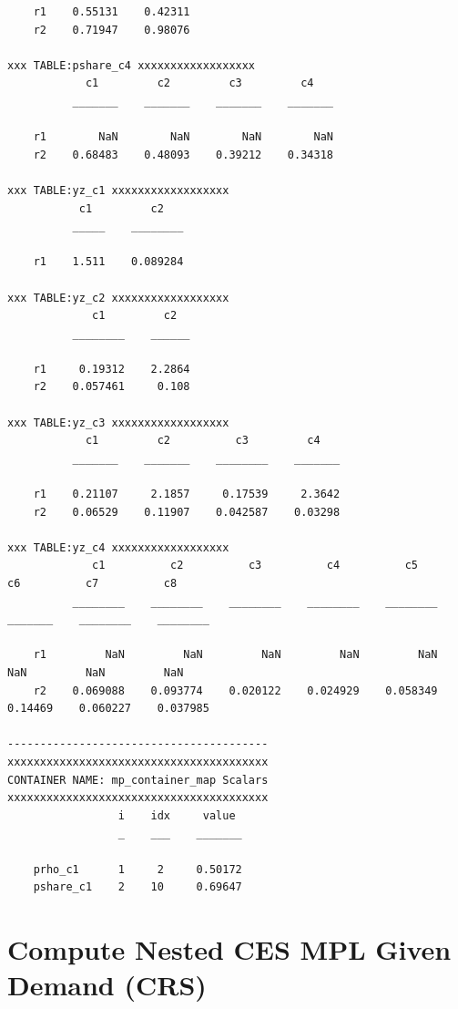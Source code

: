 \documentclass[
]{book}
\begin{document}
\begin{verbatim}
    r1    0.55131    0.42311
    r2    0.71947    0.98076

xxx TABLE:pshare_c4 xxxxxxxxxxxxxxxxxx
            c1         c2         c3         c4   
          _______    _______    _______    _______

    r1        NaN        NaN        NaN        NaN
    r2    0.68483    0.48093    0.39212    0.34318

xxx TABLE:yz_c1 xxxxxxxxxxxxxxxxxx
           c1         c2   
          _____    ________

    r1    1.511    0.089284

xxx TABLE:yz_c2 xxxxxxxxxxxxxxxxxx
             c1         c2  
          ________    ______

    r1     0.19312    2.2864
    r2    0.057461     0.108

xxx TABLE:yz_c3 xxxxxxxxxxxxxxxxxx
            c1         c2          c3         c4   
          _______    _______    ________    _______

    r1    0.21107     2.1857     0.17539     2.3642
    r2    0.06529    0.11907    0.042587    0.03298

xxx TABLE:yz_c4 xxxxxxxxxxxxxxxxxx
             c1          c2          c3          c4          c5         c6          c7          c8   
          ________    ________    ________    ________    ________    _______    ________    ________

    r1         NaN         NaN         NaN         NaN         NaN        NaN         NaN         NaN
    r2    0.069088    0.093774    0.020122    0.024929    0.058349    0.14469    0.060227    0.037985

----------------------------------------
xxxxxxxxxxxxxxxxxxxxxxxxxxxxxxxxxxxxxxxx
CONTAINER NAME: mp_container_map Scalars
xxxxxxxxxxxxxxxxxxxxxxxxxxxxxxxxxxxxxxxx
                 i    idx     value 
                 _    ___    _______

    prho_c1      1     2     0.50172
    pshare_c1    2    10     0.69647
\end{verbatim}

\hypertarget{compute-nested-ces-mpl-given-demand-crs}{%
\section{Compute Nested CES MPL Given Demand (CRS)}\label{compute-nested-ces-mpl-given-demand-crs}}
\end{document}
